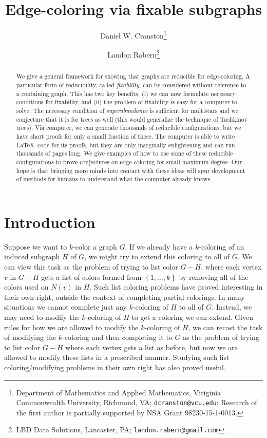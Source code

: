 \documentclass[12pt]{article}
\theoremstyle{plain}
\theoremstyle{definition}
\theoremstyle{remark}
\newcommand{\set}[1]{\left\{ #1 \right\}}
\begin{document}
\title{Edge-coloring via fixable subgraphs}
\author{Daniel W. Cranston\thanks{Department of Mathematics and Applied
Mathematics, Viriginia Commonwealth University, Richmond, VA;
\texttt{dcranston@vcu.edu}; 
Research of the first author is partially supported by NSA Grant
98230-15-1-0013.}
\and
Landon Rabern\thanks{LBD Data Solutions, Lancaster, PA;
\texttt{landon.rabern@gmail.com}}
}
\maketitle

\begin{abstract}
We give a general framework for showing that graphs are reducible for edge-coloring.  A particular form of reducibility, called \emph{fixability}, can be considered without reference to a containing graph.  This has two key benefits: (i) we can now formulate necessary conditions for fixability, and (ii) the problem of fixability is easy for a computer to solve. The necessary condition of \emph{superabundance} is sufficient for multistars and we conjecture that it is for trees as well (this would generalize the technique of Tashkinov trees). Via computer, we can generate thousands of reducible configurations, but we have short proofs for only a small fraction of these.  The computer is able to write \LaTeX\ code for its proofs, but they are only marginally enlightening and can run thousands of pages long.  We give examples of how to use some of these reducible configurations to prove conjectures on edge-coloring for small maximum degree.  Our hope is that bringing more minds into contact with these ideas will spur development of methods for humans to understand what the computer already knows.
\end{abstract}

\section{Introduction}
Suppose we want to $k$-color a graph $G$. If we already have a $k$-coloring of
an induced subgraph $H$ of $G$, we might try to extend this coloring to all of
$G$.  We can view this task as the problem of trying to list color $G-H$, where
each vertex $v$ in $G-H$ gets a list of colors formed from $\set{1, \ldots, k}$
by removing all of the colors used on $N(v)$ in $H$.  
Such list coloring problems have proved interesting in their own right, outside the
context of completing partial colorings.
In many situations we cannot complete just any $k$-coloring of $H$ to all of
$G$.  Instead, we may need to modify the $k$-coloring of $H$ to get a coloring
we can extend.  Given rules for how we are allowed to modify the $k$-coloring
of $H$, we can recast the task of modifying the $k$-coloring and then
completing it to $G$ as the problem of trying to list color $G-H$ where each
vertex gets a list as before, but now we are allowed to modify these lists in a
prescribed manner.  Studying such list coloring/modifying problems in their own
right has also proved useful.  
\end{document}
